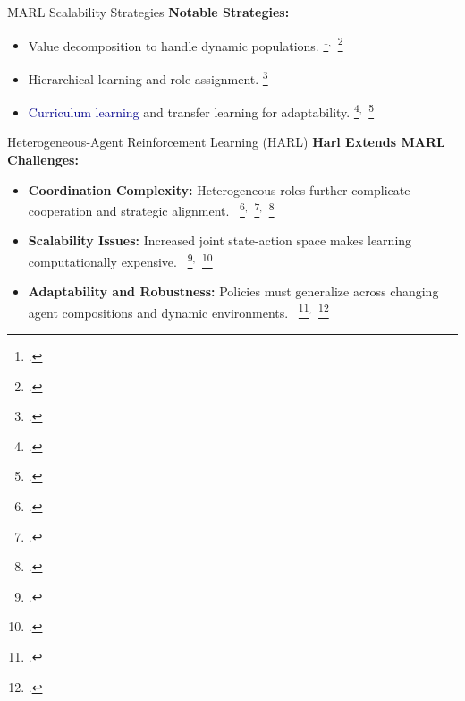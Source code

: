 
\begin{frame}{MARL Scalability Strategies}
    \textbf{Notable Strategies:}
    \begin{itemize}
        \item Value decomposition to handle dynamic populations.
            \footcite{zhang2021}$^,$~\footcite{nguyen2020}
        \item Hierarchical learning and role assignment.
            \footcite{cui2022}
        \item \textcolor{DarkBlue}{Curriculum learning} and transfer learning for adaptability.
            \footcite{shukla2022}$^,$~\footcite{shi2023}
    \end{itemize}
\end{frame}

\begin{frame}{Heterogeneous-Agent Reinforcement Learning (HARL)}
    \textbf{Harl Extends MARL Challenges:}
    \begin{itemize}
        \item \textbf{Coordination Complexity:} Heterogeneous roles further complicate 
            cooperation and strategic alignment.
            ~\footcite{wakilpoor2020}$^,$~\footcite{yang2020a}$^,$~\footcite{gronauer2022}
        \item \textbf{Scalability Issues:} Increased joint state-action space makes 
            learning computationally expensive.
            ~\footcite{leibo2021}$^,$~\footcite{rizk2019}
        \item \textbf{Adaptability and Robustness:} Policies must generalize across 
            changing agent compositions and dynamic environments.
            ~\footcite{yang2021a}$^,$~\footcite{koster2020}
    \end{itemize}
\end{frame}


